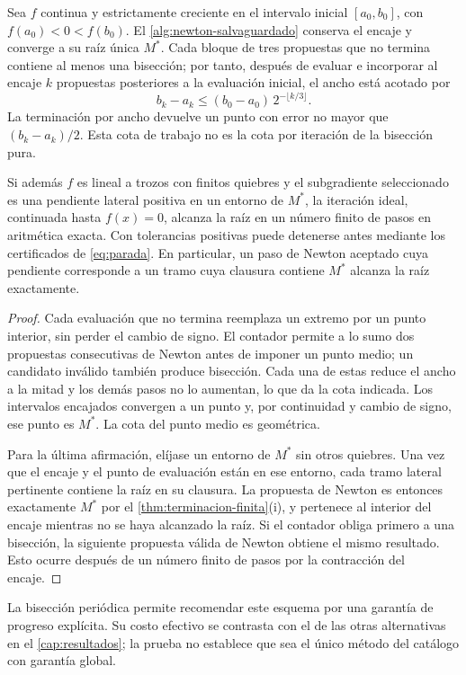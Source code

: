 \begin{theorem}
\label{thm:salvaguardado}
Sea $f$ continua y estrictamente creciente en el intervalo inicial
$[a_0,b_0]$, con $f(a_0)<0<f(b_0)$. El
\cref{alg:newton-salvaguardado} conserva el encaje y converge a su raíz única
$M^*$. Cada bloque de tres propuestas que no termina contiene al menos una
bisección; por tanto, después de evaluar e incorporar al encaje $k$
propuestas posteriores a la evaluación inicial, el ancho está acotado por
\[
  b_k-a_k\le (b_0-a_0)\,2^{-\lfloor k/3\rfloor}.
\]
La terminación por ancho devuelve un punto con error no mayor que
$(b_k-a_k)/2$. Esta cota de trabajo no es la cota por iteración de la
bisección pura.

Si además $f$ es lineal a trozos con finitos quiebres y el subgradiente
seleccionado es una pendiente lateral positiva en un entorno de $M^*$,
la iteración ideal, continuada hasta $f(x)=0$, alcanza la raíz en un
número finito de pasos en aritmética exacta. Con tolerancias positivas
puede detenerse antes mediante los certificados de \cref{eq:parada}.
En particular, un paso de Newton aceptado cuya pendiente corresponde a un
tramo cuya clausura contiene $M^*$ alcanza la raíz exactamente.
\end{theorem}
\begin{proof}
Cada evaluación que no termina reemplaza un extremo por un punto interior,
sin perder el cambio de signo. El contador permite a lo sumo dos propuestas
consecutivas de Newton antes de imponer un punto medio; un candidato inválido
también produce bisección. Cada una de estas reduce el ancho a la mitad y
los demás pasos no lo aumentan, lo que da la cota indicada. Los intervalos
encajados convergen a un punto y, por continuidad y cambio de signo, ese
punto es $M^*$. La cota del punto medio es geométrica.

Para la última afirmación, elíjase un entorno de $M^*$ sin otros quiebres.
Una vez que el encaje y el punto de evaluación están en ese entorno, cada
tramo lateral pertinente contiene la raíz en su clausura. La propuesta de
Newton es entonces exactamente $M^*$ por el
\cref{thm:terminacion-finita}(i), y pertenece al interior del encaje mientras
no se haya alcanzado la raíz. Si el contador obliga primero a una bisección,
la siguiente propuesta válida de Newton obtiene el mismo resultado. Esto
ocurre después de un número finito de pasos por la contracción del encaje.
\end{proof}

La bisección periódica permite recomendar este esquema por una garantía de
progreso explícita. Su costo efectivo se contrasta con el de las otras
alternativas en el \cref{cap:resultados}; la prueba no establece que sea el
único método del catálogo con garantía global.

